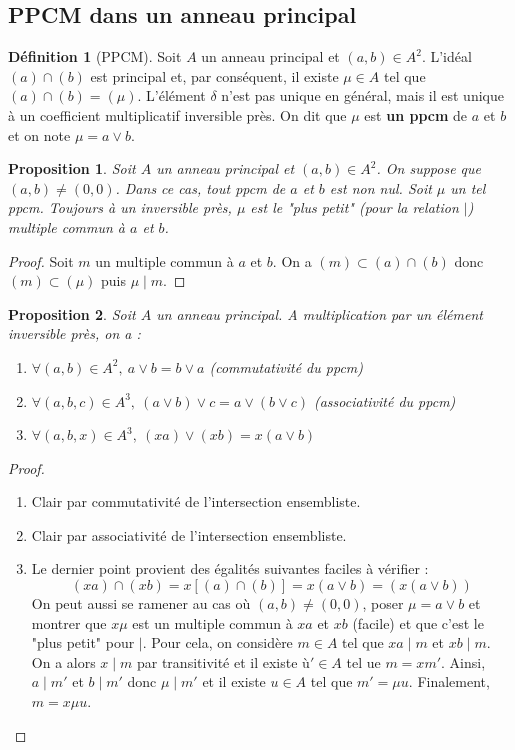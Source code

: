 \documentclass[french]{book}
\theoremstyle{plain}
\newtheorem{prop}{Proposition}[chapter]
\theoremstyle{definition}
\newtheorem{dfn}{Définition}[chapter]
\theoremstyle{remark}
\begin{document}
\subsection{PPCM dans un anneau principal}
\begin{dfn}[PPCM]
	Soit $A$ un anneau principal et $(a,b)\in A^2$. L'idéal $(a)\cap(b)$ est principal et, par conséquent, il existe $\mu\in A$ tel que $(a)\cap(b)=(\mu)$. L'élément $\delta$ n'est pas unique en général, mais il est unique à un coefficient multiplicatif inversible près. On dit que $\mu$ est \textbf{un ppcm} de $a$ et $b$ et on note $\mu=a\vee b$.
\end{dfn}
\begin{prop}
	Soit $A$ un anneau principal et $(a,b)\in A^2$. On suppose que $(a,b)\ne(0,0)$. Dans ce cas, tout ppcm de $a$ et $b$ est non nul. Soit $\mu$ un tel ppcm. Toujours à un inversible près, $\mu$ est le "plus petit" (pour la relation $\mid$) multiple commun à $a$ et $b$.
\end{prop}
\begin{proof}
	Soit $m$ un multiple commun à $a$ et $b$. On a $(m)\subset(a)\cap(b)$ donc $(m)\subset(\mu)$ puis $\mu\mid m$.
\end{proof}
\begin{prop}
Soit $A$ un anneau principal. A multiplication par un élément inversible près, on a :
\begin{enumerate}
	\item $\forall (a,b)\in A^2,\ a\vee b=b\vee a$ (commutativité du ppcm)
	\item $\forall (a,b,c)\in A^3,\ (a\vee b)\vee c=a\vee(b\vee c)$ (associativité du ppcm)
	\item $\forall (a,b,x)\in A^3,\ (xa)\vee(xb)=x(a\vee b)$
\end{enumerate}
\end{prop}
\begin{proof}
\begin{enumerate}
	\item Clair par commutativité de l'intersection ensembliste.
	\item Clair par associativité de l'intersection ensembliste.
	\item Le dernier point provient des égalités suivantes faciles à vérifier : $$(xa)\cap(xb)=x\left[(a)\cap(b)\right]=x(a\vee b)=(x(a\vee b))$$ On peut aussi se ramener au cas où $(a,b)\ne(0,0)$, poser $\mu=a\vee b$ et montrer que $x\mu$ est un multiple commun à $xa$ et $xb$ (facile) et que c'est le "plus petit" pour $\mid$. Pour cela, on considère $m\in A$ tel que $xa\mid m$ et $xb\mid m$. On a alors $x\mid m$ par transitivité et il existe $ù'\in A$ tel ue $m=xm'$. Ainsi, $a\mid m'$ et $b\mid m'$ donc $\mu\mid m'$ et il existe $u\in A$ tel que $m'=\mu u$. Finalement, $m=x\mu u$.
\end{enumerate}
\end{proof}
\end{document}
